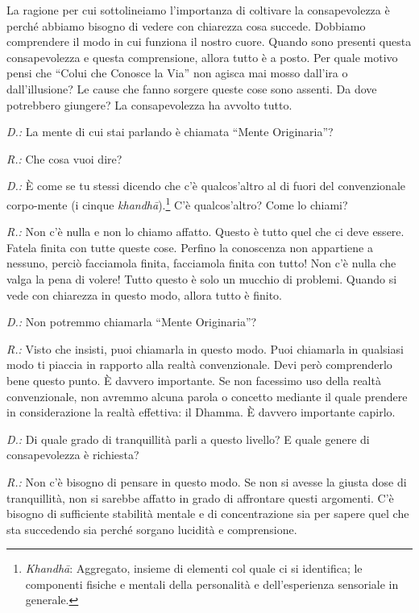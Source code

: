 La ragione per cui sottolineiamo l'importanza di coltivare la
consapevolezza è perché abbiamo bisogno di vedere con chiarezza cosa
succede. Dobbiamo comprendere il modo in cui funziona il nostro cuore.
Quando sono presenti questa consapevolezza e questa comprensione, allora
tutto è a posto. Per quale motivo pensi che ``Colui che Conosce la Via''
non agisca mai mosso dall'ira o dall'illusione? Le cause che fanno
sorgere queste cose sono assenti. Da dove potrebbero giungere? La
consapevolezza ha avvolto tutto.

\emph{D.:} La mente di cui stai parlando è chiamata ``Mente Originaria''?

\emph{R.:} Che cosa vuoi dire?

\emph{D.:} È come se tu stessi dicendo che c'è qualcos'altro al di fuori del
convenzionale corpo-mente (i cinque \emph{khandhā}).\footnote{\emph{Khandhā}:
  Aggregato, insieme di elementi col quale ci si identifica; le
  componenti fisiche e mentali della personalità e dell'esperienza
  sensoriale in generale.} C'è qualcos'altro? Come lo chiami?

\emph{R.:} Non c'è nulla e non lo chiamo affatto. Questo è tutto quel che ci
deve essere. Fatela finita con tutte queste cose. Perfino la conoscenza
non appartiene a nessuno, perciò facciamola finita, facciamola finita
con tutto! Non c'è nulla che valga la pena di volere! Tutto questo è
solo un mucchio di problemi. Quando si vede con chiarezza in questo
modo, allora tutto è finito.

\emph{D.:} Non potremmo chiamarla ``Mente Originaria''?

\emph{R.:} Visto che insisti, puoi chiamarla in questo modo. Puoi chiamarla in
qualsiasi modo ti piaccia in rapporto alla realtà convenzionale. Devi
però comprenderlo bene questo punto. È davvero importante. Se non
facessimo uso della realtà convenzionale, non avremmo alcuna parola o
concetto mediante il quale prendere in considerazione la realtà
effettiva: il Dhamma. È davvero importante capirlo.

\emph{D.:} Di quale grado di tranquillità parli a questo livello? E quale
genere di consapevolezza è richiesta?

\emph{R.:} Non c'è bisogno di pensare in questo modo. Se non si avesse la
giusta dose di tranquillità, non si sarebbe affatto in grado di
affrontare questi argomenti. C'è bisogno di sufficiente stabilità
mentale e di concentrazione sia per sapere quel che sta succedendo sia
perché sorgano lucidità e comprensione.

